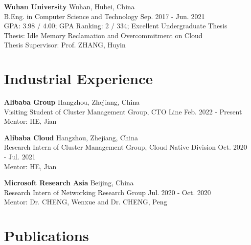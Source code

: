 \documentclass[12pt,letterpaper]{report}
\begin{document}
\vspace{0.5em}
\textbf{Wuhan University} \hfill {Wuhan, Hubei, China}\\
B.Eng. in Computer Science and Technology \hfill {Sep. 2017 - Jun. 2021}\\
GPA: 3.98 / 4.00; GPA Ranking: 2 / 334; Excellent Undergraduate Thesis\\
Thesis: Idle Memory Reclamation and Overcommitment on Cloud\\
Thesis Supervisor: Prof. ZHANG, Huyin

\section*{Industrial Experience}

\textbf{Alibaba Group} \hfill {Hangzhou, Zhejiang, China}\\
Visiting Student of Cluster Management Group, CTO Line \hfill {Feb. 2022 - Present}\\
Mentor: HE, Jian

\textbf{Alibaba Cloud} \hfill {Hangzhou, Zhejiang, China}\\
Research Intern of Cluster Management Group, Cloud Native Division \hfill {Oct. 2020 - Jul. 2021}\\
Mentor: HE, Jian

\vspace{0.5em}
\textbf{Microsoft Research Asia} \hfill {Beijing, China}\\
Research Intern of Networking Research Group \hfill {Jul. 2020 - Oct. 2020}\\
Mentor: Dr. CHENG, Wenxue and Dr. CHENG, Peng


    \section*{Publications}



\end{document}
